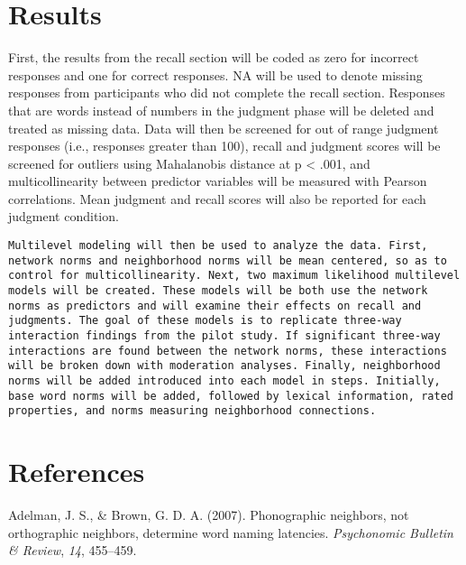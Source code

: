 \documentclass[english,man]{apa6}
\theoremstyle{definition}
\theoremstyle{definition}
\theoremstyle{definition}
\theoremstyle{remark}
\begin{document}
\section{Results}\label{results}

First, the results from the recall section will be coded as zero for
incorrect responses and one for correct responses. NA will be used to
denote missing responses from participants who did not complete the
recall section. Responses that are words instead of numbers in the
judgment phase will be deleted and treated as missing data. Data will
then be screened for out of range judgment responses (i.e., responses
greater than 100), recall and judgment scores will be screened for
outliers using Mahalanobis distance at p \textless{} .001, and
multicollinearity between predictor variables will be measured with
Pearson correlations. Mean judgment and recall scores will also be
reported for each judgment condition.

\begin{verbatim}
Multilevel modeling will then be used to analyze the data. First, network norms and neighborhood norms will be mean centered, so as to control for multicollinearity. Next, two maximum likelihood multilevel models will be created. These models will be both use the network norms as predictors and will examine their effects on recall and judgments. The goal of these models is to replicate three-way interaction findings from the pilot study. If significant three-way interactions are found between the network norms, these interactions will be broken down with moderation analyses. Finally, neighborhood norms will be added introduced into each model in steps. Initially, base word norms will be added, followed by lexical information, rated properties, and norms measuring neighborhood connections.
\end{verbatim}

\newpage

\section{References}\label{references}

\setlength{\parindent}{-0.5in} \setlength{\leftskip}{0.5in}

\hypertarget{refs}{}
\hypertarget{ref-Adelman2007}{}
Adelman, J. S., \& Brown, G. D. A. (2007). Phonographic neighbors, not
orthographic neighbors, determine word naming latencies.
\emph{Psychonomic Bulletin \& Review}, \emph{14}, 455--459.
\end{document}
